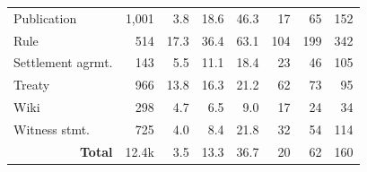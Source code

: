 \begin{table}[t]
{\begin{tabular}{@{\hspace{0.2em}}l@{\hspace{0.5em}}rrrrrrr@{\hspace{0.2em}}}
            Publication             & 1,001 & 3.8 	& 18.6 	& 46.3 	& 17 	& 65 	& 152\\
            Rule                    & 514 	& 17.3 	& 36.4 	& 63.1 	& 104 	& 199 	& 342\\
            Settlement agrmt.       & 143 	& 5.5 	& 11.1 	& 18.4 	& 23 	& 46 	& 105\\
            Treaty                  & 966 	& 13.8 	& 16.3 	& 21.2 	& 62 	& 73 	& 95\\
            Wiki                    & 298 	& 4.7 	& 6.5 	& 9.0 	& 17 	& 24 	& 34\\
            Witness stmt.           & 725 	& 4.0 	& 8.4 	& 21.8 	& 32 	& 54 	& 114\\
            \multicolumn{1}{r}{\textbf{Total}} & 12.4k & 3.5 	& 13.3 	& 36.7 	& 20 	& 62 & 160\\
	\bottomrule
	\end{tabular}
    }
\end{table}


